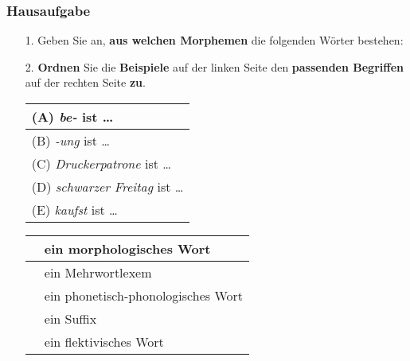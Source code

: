 \begin{frame}
\frametitle{Hausaufgabe}

\begin{enumerate}
	\item[1.] Geben Sie an, \textbf{aus welchen Morphemen} die folgenden Wörter bestehen:	
	
	

	\item[2.] \textbf{Ordnen} Sie die \textbf{Beispiele} auf der linken Seite den \textbf{passenden Begriffen} auf der rechten Seite \textbf{zu}.

	\vspace{.5cm}

\begin{minipage}{0.4\textwidth}
	\centering
	\begin{tabular}{l}

		(A) \emph{be-} ist \ldots \\
		\hline
		(B) \emph{-ung} ist \ldots \\
		\hline
		(C) \emph{Druckerpatrone} ist \ldots \\
		\hline
		(D) \emph{schwarzer Freitag} ist \ldots \\
		\hline
		(E) \emph{kaufst} ist \ldots \\

	\end{tabular}
\end{minipage}
\hfill%
\begin{minipage}{0.56\textwidth}
	\centering
	\begin{tabular}{|p{}|l}

		 & ein morphologisches Wort \\
		\hline
		 & ein Mehrwortlexem \\
		\hline
		 & ein phonetisch-phonologisches Wort \\
		\hline
		 & ein Suffix\\
		\hline
		 & ein flektivisches Wort \\

	\end{tabular}
\end{minipage}

\end{enumerate}


\end{frame}


